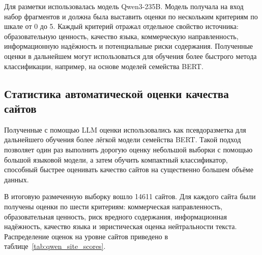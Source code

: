 \documentclass[oneside,senior,etd]{BYUPhys}
\begin{document}
Для разметки использовалась модель Qwen3-235B. 
Модель получала на вход набор фрагментов и должна была выставить оценки по нескольким критериям по шкале от 0 до 5. 
Каждый критерий отражал отдельное свойство источника: образовательную ценность, качество языка, коммерческую направленность, информационную надёжность и потенциальные риски содержания. 
Полученные оценки в дальнейшем могут использоваться для обучения более быстрого метода классификации, например, на основе моделей семейства BERT.

\subsection{Статистика автоматической оценки качества сайтов}

Полученные с помощью LLM оценки использовались как псевдоразметка для дальнейшего обучения более лёгкой модели семейства BERT. 
Такой подход позволяет один раз выполнить дорогую оценку небольшой выборки с помощью большой языковой модели, 
а затем обучить компактный классификатор, способный быстрее оценивать качество сайтов на существенно большем объёме данных.

В итоговую размеченную выборку вошло 14611 сайтов. 
Для каждого сайта были получены оценки по шести критериям: коммерческая направленность, образовательная ценность, 
риск вредного содержания, информационная надёжность, качество языка и эвристическая оценка нейтральности текста. 
Распределение оценок на уровне сайтов приведено в таблице~\ref{tab:qwen_site_scores}.

\begin{table}[h]
    \centering
    \small
    \setlength{\tabcolsep}{4pt}
    \caption{Распределение LLM-оценок качества сайтов}
    \label{tab:qwen_site_scores}
\end{table}
\end{document}
